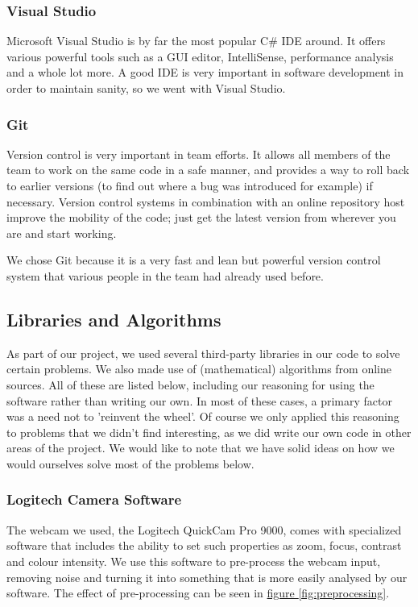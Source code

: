 \documentclass[10pt, abstracton, twocolumn]{scrartcl}
\newcommand{\fref}[1]{\hyperref[#1]{figure \vref{#1}}}
\begin{document}
\subsubsection{Visual Studio}
Microsoft Visual Studio is by far the most popular C\# IDE around. It offers various powerful tools such as a GUI editor, IntelliSense, performance analysis and a whole lot more. A good IDE is very important in software development in order to maintain sanity, so we went with Visual Studio.

\subsubsection{Git}
Version control is very important in team efforts. It allows all members of the team to work on the same code in a safe manner, and provides a way to roll back to earlier versions (to find out where a bug was introduced for example) if necessary. Version control systems in combination with an online repository host improve the mobility of the code; just get the latest version from wherever you are and start working.

We chose Git because it is a very fast and lean but powerful version control system that various people in the team had already used before.

\subsection{Libraries and Algorithms}
As part of our project, we used several third-party libraries in our code to solve certain problems. We also made use of (mathematical) algorithms from online sources. All of these are listed below, including our reasoning for using the software rather than writing our own. In most of these cases, a primary factor was a need not to 'reinvent the wheel'. Of course we only applied this reasoning to problems that we didn't find interesting, as we did write our own code in other areas of the project. We would like to note that we have solid ideas on how we would ourselves solve most of the problems below.

\subsubsection{Logitech Camera Software}
The webcam we used, the Logitech QuickCam Pro 9000, comes with specialized software that includes the ability to set such properties as zoom, focus, contrast and colour intensity. We use this software to pre-process the webcam input, removing noise and turning it into something that is more easily analysed by our software. The effect of pre-processing can be seen in \fref{fig:preprocessing}.
\end{document}

